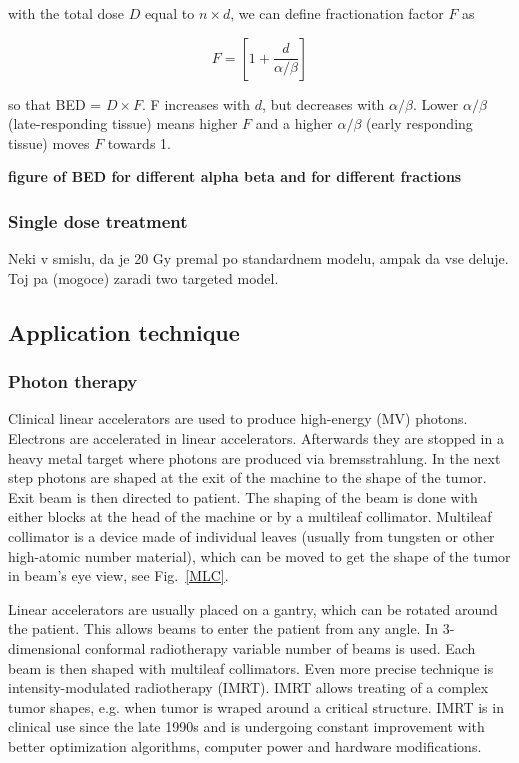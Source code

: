 \documentclass[type=dr, dr=rernat, accentcolor=tud7b,colorbacktitle, bigchapter, openright, twoside, 12pt ]{tudthesis}
\begin{document}
with the total dose $D$ equal to $n \times d$, we can define fractionation factor $F$ as

\begin{equation}
 F = \left[1 + \frac{d}{\alpha / \beta} \right]
\end{equation}

so that BED = $D \times F$. F increases with $d$, but decreases with $\alpha / \beta$. Lower $\alpha / \beta$ (late-responding tissue)
means higher $F$ and a higher $\alpha / \beta$ (early responding tissue) moves $F$ towards 1.

\textbf{figure of BED for different alpha beta and for different fractions}

\subsubsection{Single dose treatment}

Neki v smislu, da je 20 Gy premal po standardnem modelu, ampak da vse deluje. Toj pa (mogoce) zaradi two targeted model.

\subsection{Application technique}



\subsubsection{Photon therapy}

Clinical linear accelerators are used to produce high-energy (MV) photons. Electrons are accelerated in linear accelerators. Afterwards they are stopped in a heavy metal target where photons are produced via bremsstrahlung.
In the next step photons are shaped at the exit of the machine to the shape of the tumor. Exit beam is then directed to patient. The shaping of the beam is done with either blocks at the head of the machine or by a 
multileaf collimator. Multileaf collimator is a device made of individual leaves (usually from tungsten or other high-atomic number material), which can be moved to get the shape of the tumor in beam's eye view, see Fig.~\ref{MLC}. 

Linear accelerators are usually placed on a gantry, which can be rotated around the patient. This allows beams to enter the patient from any angle. In 3-dimensional conformal radiotherapy variable number of beams is used. 
Each beam is then shaped with multileaf collimators. Even more precise technique is intensity-modulated radiotherapy (IMRT). IMRT allows treating of a complex tumor shapes, e.g. when tumor is wraped around a critical structure. IMRT is
in clinical use since the late 1990s and is undergoing constant improvement with better optimization algorithms, computer power and hardware modifications. 
\end{document}
